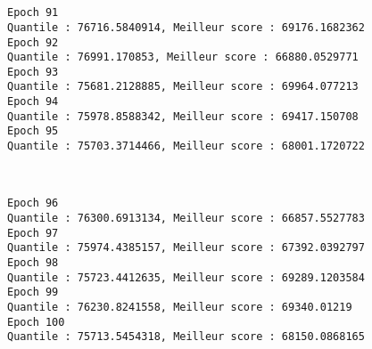 \documentclass[11pt]{article}
\begin{document}
    \begin{center}
    \end{center}
    { \hspace*{\fill} \\}
    
    \begin{center}
    \end{center}
    { \hspace*{\fill} \\}
    
    \begin{Verbatim}[commandchars=\\\{\}]
Epoch 91
Quantile : 76716.5840914, Meilleur score : 69176.1682362
Epoch 92
Quantile : 76991.170853, Meilleur score : 66880.0529771
Epoch 93
Quantile : 75681.2128885, Meilleur score : 69964.077213
Epoch 94
Quantile : 75978.8588342, Meilleur score : 69417.150708
Epoch 95
Quantile : 75703.3714466, Meilleur score : 68001.1720722

    \end{Verbatim}

    \begin{center}
    \end{center}
    { \hspace*{\fill} \\}
    
    \begin{Verbatim}[commandchars=\\\{\}]
Epoch 96
Quantile : 76300.6913134, Meilleur score : 66857.5527783
Epoch 97
Quantile : 75974.4385157, Meilleur score : 67392.0392797
Epoch 98
Quantile : 75723.4412635, Meilleur score : 69289.1203584
Epoch 99
Quantile : 76230.8241558, Meilleur score : 69340.01219
Epoch 100
Quantile : 75713.5454318, Meilleur score : 68150.0868165

    \end{Verbatim}

    \begin{center}
    \end{center}
    { \hspace*{\fill} \\}
    
    \begin{center}
    \end{center}
    { \hspace*{\fill} \\}
    
\end{document}
